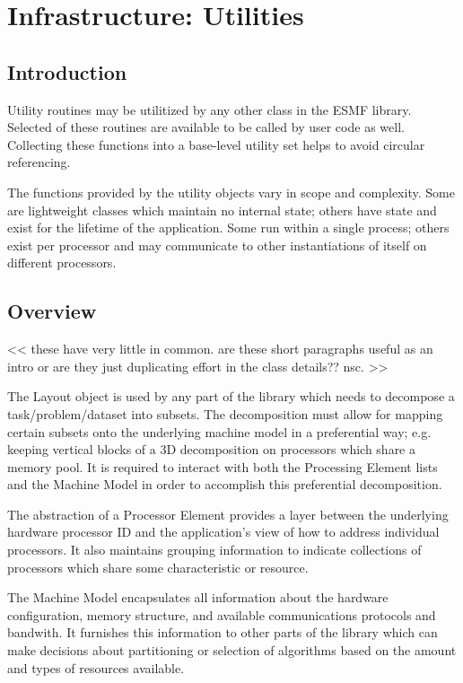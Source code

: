 \section{Infrastructure: Utilities}

\subsection{Introduction}

Utility routines may be utilitized by any other class in the ESMF
library.  
Selected of these routines are available to be called by user code as well.
Collecting these functions into a base-level utility set helps to 
avoid circular referencing.

The functions provided by the utility objects vary in scope and
complexity.  Some are lightweight classes which maintain no
internal state; others have state and exist for the lifetime of
the application.  Some run within a single process; others
exist per processor and may communicate to other instantiations
of itself on different processors.

\subsection{Overview}

<< these have very little in common.  are these short paragraphs
useful as an intro or are they just duplicating effort in the
class details??  nsc.  >>

The Layout object is used by any part of the library which needs
to decompose a task/problem/dataset into subsets.
The decomposition must allow for mapping certain subsets onto the
underlying machine model in a preferential way; e.g. keeping
vertical blocks of a 3D decomposition on processors which share
a memory pool.
It is required to interact with both the Processing Element lists
and the Machine Model in order to accomplish this preferential
decomposition.

The abstraction of a Processor Element provides a layer between
the underlying hardware processor ID and the application's view
of how to address individual processors.  It also maintains
grouping information to indicate collections of processors which
share some characteristic or resource.

The Machine Model encapsulates all information about the
hardware configuration, memory structure, and available
communications protocols and bandwith.  It furnishes this
information to other parts of the library which can
make decisions about partitioning or selection of algorithms
based on the amount and types of resources available.

